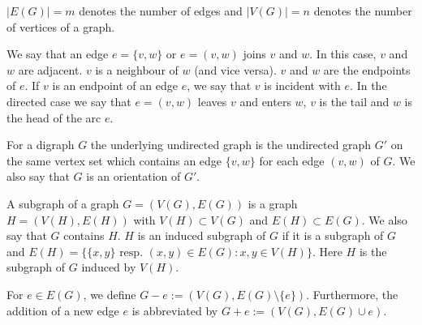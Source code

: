\begin{definition}
$|E(G)|=m$ denotes the number of edges
and $|V(G)|=n$ denotes the number of vertices of a graph.
\end{definition}
\begin{definition}

We say that an edge $e = \{v, w\}$ or $e = (v, w)$ joins $v$ and $w$. In this case, $v$ and $w$ are adjacent. $v$ is a 
neighbour of $w$ (and vice versa). $v$ and $w$ are the endpoints of $e$. If $v$ is an endpoint of an edge $e$, we say 
that $v$ is incident with $e$. 
In the directed case we say that $e=( v, w)$ leaves $v$ and enters $w$,
$v$ is the tail and $w$ is the head of the arc $e$. %
 
\end{definition}

\begin{definition}
For a digraph $G$ the underlying undirected graph is the undirected graph $G'$ on the same 
vertex set which contains an edge $\{v, w\}$
for each edge $(v, w)$ of $G$. We also say that $G$ is an orientation of $G'$.
\end{definition}
\begin{definition}
A subgraph of a graph $G = (V(G), E(G))$ is a graph $H = (V(H), E(H))$
with $V(H) \subset V(G)$ and $E(H) \subset E(G)$. We also say that $G$ contains $H$. $H$ is an
induced subgraph of $G$ if it is a subgraph of $G$ and $E (H) = \{ \{x, y\} \textrm{ resp. } (x, y) \in
E(G) : x, y \in V(H)\}$. 
Here $H$ is the subgraph of $G$ induced by $V(H)$. 
\end{definition}

\begin{definition}
For $e \in E(G)$, we define $G- e := (V(G), E(G) \setminus \{e\})$. Furthermore, the addition
of a new edge $e$ is abbreviated by $G + e := (V(G), E(G) \cup {e})$. 
\end{definition}

